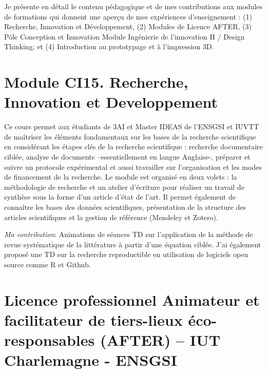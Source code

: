 \documentclass[
  12pt,
  oneside]{book}
\begin{document}
Je présente en détail le contenu pédagogique et de mes contributions aux modules de formations qui donnent une aperçu de mes expériences d'enseignement : (1) Recherche, Innovation et Développement, (2) Modules de Licence AFTER, (3) Pôle Conception et Innovation Module Ingénierie de l'innovation II / Design Thinking; et (4) Introduction au prototypage et à l'impression 3D.

\hypertarget{module-ci15.-recherche-innovation-et-developpement}{%
\section{Module CI15. Recherche, Innovation et Developpement}\label{module-ci15.-recherche-innovation-et-developpement}}

Ce cours permet aux étudiants de 3AI et Master IDEAS de l'ENSGSI et IUVTT de maîtriser les éléments fondamentaux sur les bases de la recherche scientifique en considérant les étapes clés de la recherche scientifique : recherche documentaire ciblée, analyse de documents --essentiellement en langue Anglaise-, préparer et suivre un protocole expérimental et aussi travailler sur l'organisation et les modes de financement de la recherche.
Le module est organisé en deux volets : la méthodologie de recherche et un atelier d'écriture pour réaliser un travail de synthèse sous la forme d'un article d'état de l'art. Il permet également de connaître les bases des données scientifiques, présentation de la structure des articles scientifiques et la gestion de référence (Mendeley et Zotero).

\emph{Ma contribution}: Animations de séances TD sur l'application de la méthode de revue systématique de la littérature à partir d'une équation ciblée. J'ai également proposé une TD sur la recherche reproductible en utilisation de logiciels open source comme R et Github.

\hypertarget{licence-professionnel-animateur-et-facilitateur-de-tiers-lieux-uxe9co-responsables-after-iut-charlemagne---ensgsi}{%
\section{Licence professionnel Animateur et facilitateur de tiers-lieux éco-responsables (AFTER) -- IUT Charlemagne - ENSGSI}\label{licence-professionnel-animateur-et-facilitateur-de-tiers-lieux-uxe9co-responsables-after-iut-charlemagne---ensgsi}}
\end{document}
